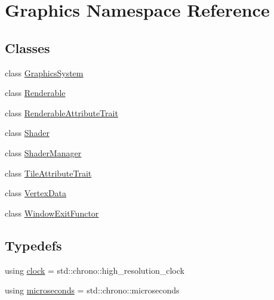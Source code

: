 \hypertarget{namespace_graphics}{}\section{Graphics Namespace Reference}
\label{namespace_graphics}
\subsection*{Classes}
\begin{DoxyCompactItemize}
\item 
class \hyperlink{class_graphics_1_1_graphics_system}{Graphics\+System}
\item 
class \hyperlink{class_graphics_1_1_renderable}{Renderable}
\item 
class \hyperlink{class_graphics_1_1_renderable_attribute_trait}{Renderable\+Attribute\+Trait}
\item 
class \hyperlink{class_graphics_1_1_shader}{Shader}
\item 
class \hyperlink{class_graphics_1_1_shader_manager}{Shader\+Manager}
\item 
class \hyperlink{class_graphics_1_1_tile_attribute_trait}{Tile\+Attribute\+Trait}
\item 
class \hyperlink{class_graphics_1_1_vertex_data}{Vertex\+Data}
\item 
class \hyperlink{class_graphics_1_1_window_exit_functor}{Window\+Exit\+Functor}
\end{DoxyCompactItemize}
\subsection*{Typedefs}
\begin{DoxyCompactItemize}
\item 
using \hyperlink{namespace_graphics_a635a9370417d23abc14af575c8ebe3e1}{clock} = std\+::chrono\+::high\+\_\+resolution\+\_\+clock
\item 
using \hyperlink{namespace_graphics_ad7dba8f38ef1196be8cd743df4e2407c}{microseconds} = std\+::chrono\+::microseconds
\end{DoxyCompactItemize}
